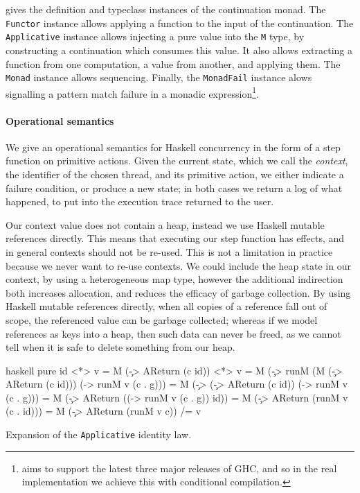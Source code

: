  gives the definition and typeclass instances of the
\dejafu{} continuation monad.  The \verb|Functor| instance allows
applying a function to the input of the continuation.  The
\verb|Applicative| instance allows injecting a pure value into the
\verb|M| type, by constructing a continuation which consumes this
value.  It also allows extracting a function from one computation, a
value from another, and applying them.  The \verb|Monad| instance
allows sequencing.  Finally, the \verb|MonadFail| instance alows
signalling a pattern match failure in a monadic
expression\footnote{\dejafu{} aims to support the latest three major
  releases of GHC, and so in the real implementation we achieve this
  with conditional compilation.}.

\paragraph{Operational semantics}
We give an operational semantics for Haskell concurrency in the form of a step
function on primitive actions.  Given the current state, which we call the
\emph{context}, the identifier of the chosen thread, and its primitive action,
we either indicate a failure condition, or produce a new state; in both cases we
return a log of what happened, to put into the execution trace returned to the
user.

Our context value does not contain a heap, instead we use Haskell
mutable references directly.  This means that executing our step
function has effects, and in general contexts should not be re-used.
This is not a limitation in practice because we never want to re-use
contexts.  We could include the heap state in our context, by using a
heterogeneous map type, however the additional indirection both
increases allocation, and reduces the efficacy of garbage collection.
By using Haskell mutable references directly, when all copies of a
reference fall out of scope, the referenced value can be garbage
collected; whereas if we model references as keys into a heap, then
such data can never be freed, as we cannot tell when it is safe to
delete something from our heap.

\begin{listing}
\centering
\begin{cminted}{haskell}
pure id <*> v
  = M (\c -> AReturn (c id)) <*> v
  = M (\c -> runM (M (\c -> AReturn (c id))) (\g -> runM v (c . g)))
  = M (\c -> (\c -> AReturn (c id)) (\g -> runM v (c . g)))
  = M (\c -> AReturn ((\g -> runM v (c . g)) id))
  = M (\c -> AReturn (runM v (c . id)))
  = M (\c -> AReturn (runM v c))
 /= v
\end{cminted}
\caption{Expansion of the \texttt{Applicative} identity law.}\label{lst:areturn}
\end{listing}

